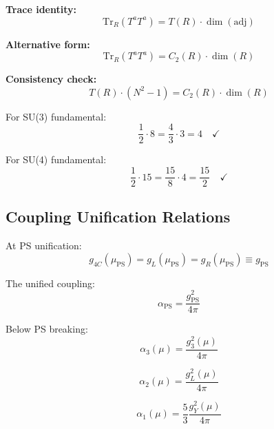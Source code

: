 \documentclass[11pt,a4paper]{article}
\theoremstyle{definition}
\begin{document}
\textbf{Trace identity:}
\begin{equation}
  \label{eq:trace-id-1}
  \text{Tr}_R(T^a T^a) = T(R) \cdot \dim(\text{adj})
\end{equation}

\textbf{Alternative form:}
\begin{equation}
  \label{eq:trace-id-2}
  \text{Tr}_R(T^a T^a) = C_2(R) \cdot \dim(R)
\end{equation}

\textbf{Consistency check:}
\begin{equation}
  \label{eq:trace-consist}
  T(R) \cdot (N^2 - 1) = C_2(R) \cdot \dim(R)
\end{equation}

For SU(3) fundamental:
\begin{equation}
  \label{eq:su3-check}
  \frac{1}{2} \cdot 8 = \frac{4}{3} \cdot 3 = 4 \quad \checkmark
\end{equation}

For SU(4) fundamental:
\begin{equation}
  \label{eq:su4-check}
  \frac{1}{2} \cdot 15 = \frac{15}{8} \cdot 4 = \frac{15}{2} \quad \checkmark
\end{equation}

\subsection{Coupling Unification Relations}
\label{subsec:unif-relations}

At PS unification:
\begin{equation}
  \label{eq:unif-1}
  g_{4C}(\mu_{\text{PS}}) = g_L(\mu_{\text{PS}}) = g_R(\mu_{\text{PS}}) \equiv g_{\text{PS}}
\end{equation}

The unified coupling:
\begin{equation}
  \label{eq:unif-2}
  \alpha_{\text{PS}} = \frac{g_{\text{PS}}^2}{4\pi}
\end{equation}

Below PS breaking:
\begin{equation}
  \label{eq:below-ps-1}
  \alpha_3(\mu) = \frac{g_3^2(\mu)}{4\pi}
\end{equation}

\begin{equation}
  \label{eq:below-ps-2}
  \alpha_2(\mu) = \frac{g_L^2(\mu)}{4\pi}
\end{equation}

\begin{equation}
  \label{eq:below-ps-3}
  \alpha_1(\mu) = \frac{5}{3} \frac{g_Y^2(\mu)}{4\pi}
\end{equation}
\end{document}
